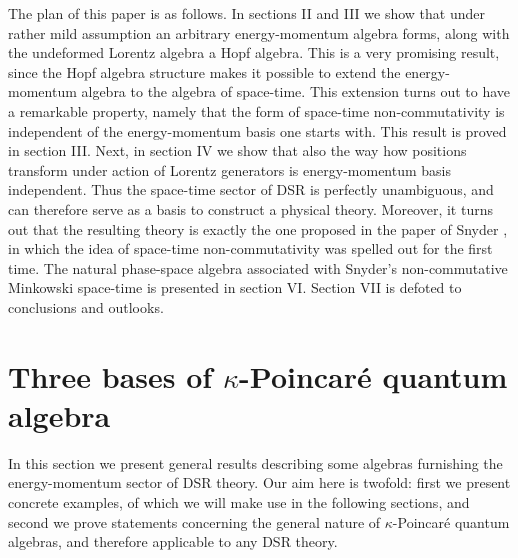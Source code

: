 \documentclass [prd,twocolumn,nofootinbib,showpacs]  {revtex4}
\begin{document}
The plan of this paper is as follows. In sections II and III we
show that under rather mild assumption an arbitrary
energy-momentum algebra forms, along with the undeformed Lorentz
algebra a Hopf algebra. This is a very promising result, since the
Hopf algebra structure makes it possible to extend the
energy-momentum algebra to the algebra of space-time. This
extension turns out to have a remarkable property, namely that the
form of space-time non-commutativity is independent of the
energy-momentum basis one starts with. This result is proved in
section III. Next, in section IV  we show that also the way how
positions transform under action of Lorentz generators is
energy-momentum basis independent. Thus the space-time sector of
DSR is perfectly unambiguous, and can therefore serve as a basis
to construct a physical theory. Moreover, it turns out that the
resulting theory is exactly the one proposed in the  paper of
Snyder \cite{snyder}, in which the idea of space-time
non-commutativity was spelled out for the first time. The natural
phase-space algebra associated with Snyder's non-commutative
Minkowski space-time is presented in section VI. Section VII is
defoted to conclusions and outlooks.



\section{Three bases of $\kappa$-Poincar\'e quantum algebra}

In this section we present general results describing some
algebras  furnishing the energy-momentum sector of DSR theory. Our
aim here is twofold: first we  present concrete examples, of which
we will make use in the following sections, and second we prove
statements concerning the general nature of $\kappa$-Poincar\'e
quantum algebras, and therefore applicable to any DSR theory.
\end{document}

